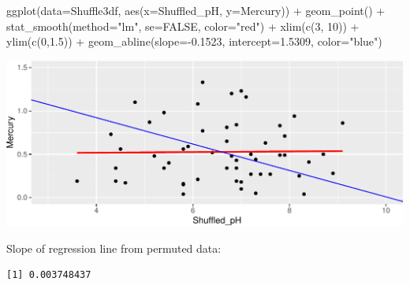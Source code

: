 \documentclass[
  letterpaper,
  DIV=11,
  numbers=noendperiod]{scrreprt}
\newenvironment{Shaded}{\begin{snugshade}}{\end{snugshade}}
\newcommand{\AttributeTok}[1]{\textcolor[rgb]{0.40,0.45,0.13}{#1}}
\newcommand{\ConstantTok}[1]{\textcolor[rgb]{0.56,0.35,0.01}{#1}}
\newcommand{\DecValTok}[1]{\textcolor[rgb]{0.68,0.00,0.00}{#1}}
\newcommand{\FloatTok}[1]{\textcolor[rgb]{0.68,0.00,0.00}{#1}}
\newcommand{\FunctionTok}[1]{\textcolor[rgb]{0.28,0.35,0.67}{#1}}
\newcommand{\NormalTok}[1]{\textcolor[rgb]{0.00,0.23,0.31}{#1}}
\newcommand{\OtherTok}[1]{\textcolor[rgb]{0.00,0.23,0.31}{#1}}
\newcommand{\SpecialCharTok}[1]{\textcolor[rgb]{0.37,0.37,0.37}{#1}}
\newcommand{\StringTok}[1]{\textcolor[rgb]{0.13,0.47,0.30}{#1}}
\begin{document}
\begin{Shaded}
\begin{Highlighting}[]
\FunctionTok{ggplot}\NormalTok{(}\AttributeTok{data=}\NormalTok{Shuffle3df, }\FunctionTok{aes}\NormalTok{(}\AttributeTok{x=}\NormalTok{Shuffled\_pH, }\AttributeTok{y=}\NormalTok{Mercury)) }\SpecialCharTok{+} 
  \FunctionTok{geom\_point}\NormalTok{() }\SpecialCharTok{+} \FunctionTok{stat\_smooth}\NormalTok{(}\AttributeTok{method=}\StringTok{"lm"}\NormalTok{, }\AttributeTok{se=}\ConstantTok{FALSE}\NormalTok{, }\AttributeTok{color=}\StringTok{"red"}\NormalTok{) }\SpecialCharTok{+} 
  \FunctionTok{xlim}\NormalTok{(}\FunctionTok{c}\NormalTok{(}\DecValTok{3}\NormalTok{, }\DecValTok{10}\NormalTok{)) }\SpecialCharTok{+} \FunctionTok{ylim}\NormalTok{(}\FunctionTok{c}\NormalTok{(}\DecValTok{0}\NormalTok{,}\FloatTok{1.5}\NormalTok{)) }\SpecialCharTok{+} 
  \FunctionTok{geom\_abline}\NormalTok{(}\AttributeTok{slope=}\SpecialCharTok{{-}}\FloatTok{0.1523}\NormalTok{, }\AttributeTok{intercept=}\FloatTok{1.5309}\NormalTok{, }\AttributeTok{color=}\StringTok{"blue"}\NormalTok{)}
\end{Highlighting}
\end{Shaded}

\includegraphics{Ch3_files/figure-pdf/unnamed-chunk-224-1.pdf}

Slope of regression line from permuted data:

\begin{Shaded}
\end{Shaded}

\begin{verbatim}
[1] 0.003748437
\end{verbatim}
\end{document}
